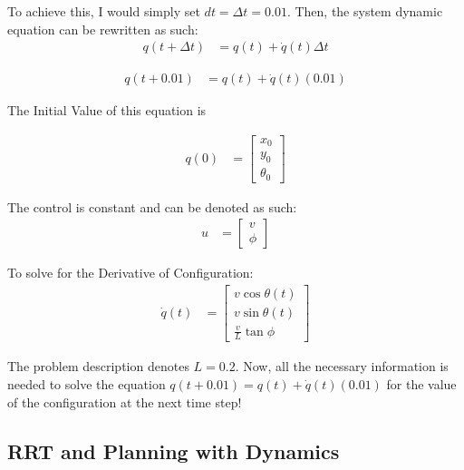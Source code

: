 \documentclass{article}
\begin{document}
To achieve this, I would simply set $dt = \Delta t = 0.01$. Then, the system dynamic equation can be rewritten as such: \newline 
\begin{align}
    q(t + \Delta t) &= q(t) + \dot{q}(t) \Delta t
\end{align}

\begin{align}
    q(t + 0.01) &= q(t) + \dot{q}(t) (0.01)
\end{align}

The Initial Value of this equation is 

\begin{align}
    q(0) &= \begin{bmatrix}
           x_0 \\
           y_0 \\
           \theta_0
         \end{bmatrix}
\end{align}

The control is constant and can be denoted as such: 
\begin{align}
    u &= \begin{bmatrix}
           v \\
           \phi
         \end{bmatrix}
\end{align}

To solve for the Derivative of Configuration: \newline 
\begin{align}
    \dot{q}(t) &= \begin{bmatrix}
           v\cos{\theta(t)} \\
           v\sin{\theta(t)} \\
           \frac{v}{L} \tan{\phi}
         \end{bmatrix}
\end{align}

The problem description denotes $L = 0.2$. Now, all the necessary information is needed to solve the equation $q(t + 0.01) = q(t) + \dot{q}(t) (0.01)$ for the value of the configuration at the next time step! 
\subsection{RRT and Planning with Dynamics}
\end{document}
